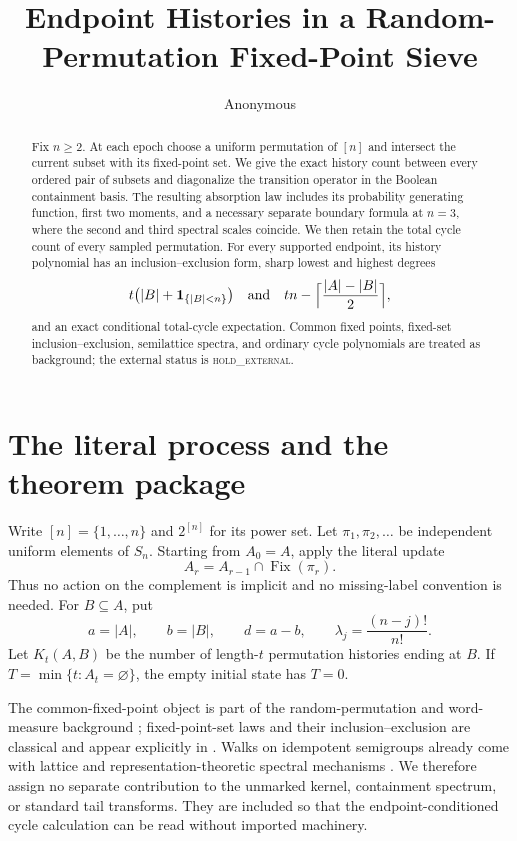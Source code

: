 \documentclass[a4paper,10pt]{amsart}
\title[Random-permutation fixed-point sieves]{Endpoint Histories in a Random-Permutation Fixed-Point Sieve}
\author{Anonymous}
\date{}
\theoremstyle{remark}
\newcommand{\Fix}{\operatorname{Fix}}
\newcommand{\ind}{\mathbf 1}
\begin{document}
\begin{abstract}
Fix $n\ge2$.  At each epoch choose a uniform permutation of $[n]$ and
intersect the current subset with its fixed-point set.  We give the exact
history count between every ordered pair of subsets and diagonalize the
transition operator in the Boolean containment basis.  The resulting
absorption law includes its probability generating function, first two
moments, and a necessary separate boundary formula at $n=3$, where the
second and third spectral scales coincide.  We then retain the total cycle
count of every sampled permutation.  For every supported endpoint, its
history polynomial has an inclusion--exclusion form, sharp lowest and
highest degrees
\[
 t\bigl(|B|+\ind_{\{|B|<n\}}\bigr)
 \quad\hbox{and}\quad
 tn-\Bigl\lceil\frac{|A|-|B|}{2}\Bigr\rceil,
\]
and an exact conditional total-cycle expectation.  Common fixed points,
fixed-set inclusion--exclusion, semilattice spectra, and ordinary cycle
polynomials are treated as background; the external status is
\textsc{hold\_external}.
\end{abstract}

\maketitle

\section{The literal process and the theorem package}

Write $[n]=\{1,\ldots,n\}$ and $2^{[n]}$ for its power set.  Let
$\pi_1,\pi_2,\ldots$ be independent uniform elements of $S_n$.  Starting
from $A_0=A$, apply the literal update
\begin{equation}\label{eq:update}
             A_r=A_{r-1}\cap\Fix(\pi_r).
\end{equation}
Thus no action on the complement is implicit and no missing-label convention
is needed.  For $B\subseteq A$, put
\[
 a=|A|,\qquad b=|B|,\qquad d=a-b,
 \qquad \lambda_j=\frac{(n-j)!}{n!}.
\]
Let $K_t(A,B)$ be the number of length-$t$ permutation histories ending at
$B$.  If $T=\min\{t:A_t=\varnothing\}$, the empty initial state has $T=0$.

The common-fixed-point object is part of the random-permutation and word-
measure background \cite{HananyPuder2023}; fixed-point-set laws and their
inclusion--exclusion are classical and appear explicitly in
\cite{DiaconisEvansGraham2014}.  Walks on idempotent semigroups already come
with lattice and representation-theoretic spectral mechanisms
\cite{Brown2000,AyyerEtAl2015}.  We therefore assign no separate contribution
to the unmarked kernel, containment spectrum, or standard tail transforms.
They are included so that the endpoint-conditioned cycle calculation can be
read without imported machinery.
\end{document}
